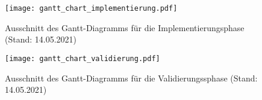 \documentclass[../review_1.tex]{subfiles}
\begin{document}
\begin{figure} [h]
    \centering
    \vspace{-0.5cm}
    \texttt{[image: gantt\_chart\_implementierung.pdf]}
    \caption{Ausschnitt des Gantt-Diagramms für die Implementierungsphase (Stand: 14.05.2021)}
    \label{vm3}
\end{figure}

\begin{figure} [h]
    \centering
    \texttt{[image: gantt\_chart\_validierung.pdf]}
    \caption{Ausschnitt des Gantt-Diagramms für die Validierungssphase (Stand: 14.05.2021)}     
    \label{vm4}
\end{figure}

\end{document}
